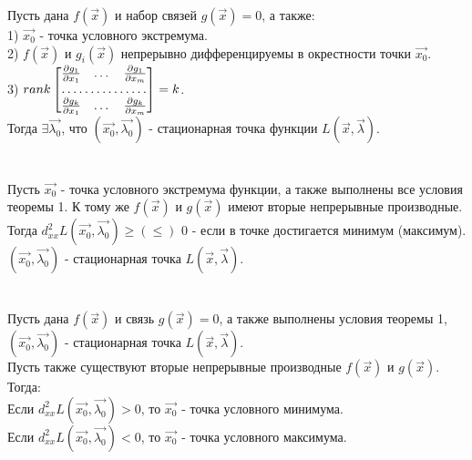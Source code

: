\documentclass[12pt]{article}
\begin{document}
Пусть дана $f(\overrightarrow{x})$ и набор связей $g(\overrightarrow{x}) = 0$, а также:\\
1) $\overrightarrow{x_0}$ - точка условного экстремума.\\
2) $f(\overrightarrow{x})$ и $g_i(\overrightarrow{x})$ непрерывно дифференцируемы в окрестности точки $\overrightarrow{x_0}$.\\
3) $rank \begin{bmatrix}
   \frac{\partial g_1}{\partial x_1} & \dots & \frac{\partial g_1}{\partial x_m} \\
    \hdotsfor{3} \\
    \frac{\partial g_k}{\partial x_1} & \dots & \frac{\partial g_k}{\partial x_m} \\
\end{bmatrix} =k$.\\
Тогда $\exists \overrightarrow{\lambda_0}$, что $(\overrightarrow{x_0}, \overrightarrow{\lambda_0})$ - стационарная точка функции $L(\overrightarrow{x}, \overrightarrow{\lambda})$.\\
\\
\\
Пусть $\overrightarrow{x_0}$ - точка условного экстремума функции, а также выполнены все условия теоремы 1. К тому же $f(\overrightarrow{x})$ и $g(\overrightarrow{x})$ имеют вторые непрерывные производные.\\
Тогда $d^2_{xx} L (\overrightarrow{x_0},\overrightarrow{\lambda_0}) \geq (\leq)$ 0 - если в точке достигается минимум (максимум).\\
$(\overrightarrow{x_0},\overrightarrow{\lambda_0})$ - стационарная точка $L(\overrightarrow{x},\overrightarrow{\lambda})$.\\
\\
\\
Пусть дана $f(\overrightarrow{x})$ и связь $g(\overrightarrow{x}) = 0$, а также выполнены условия теоремы 1, $(\overrightarrow{x_0},\overrightarrow{\lambda_0})$ - стационарная точка $L(\overrightarrow{x},\overrightarrow{\lambda})$.\\
Пусть также существуют вторые непрерывные производные $f(\overrightarrow{x})$ и $g(\overrightarrow{x})$.\\
Тогда:\\
Если $d^2_{xx}L(\overrightarrow{x_0},\overrightarrow{\lambda_0}) >0$, то $\overrightarrow{x_0}$ - точка условного минимума.\\
Если $d^2_{xx}L(\overrightarrow{x_0},\overrightarrow{\lambda_0}) <0$, то $\overrightarrow{x_0}$ - точка условного максимума.\\
\end{document}
